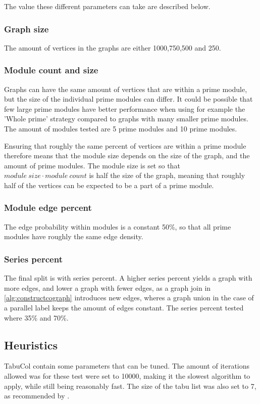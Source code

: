 \documentclass[a4paper]{article}
\begin{document}
The value these different parameters can take are described below.
\subsubsection{Graph size}

The amount of vertices in the graphs are either 1000,750,500 and 250.

\subsubsection{Module count and size}

Graphs can have the same amount of vertices that are within a prime module,
but the size of the individual prime modules can differ. It could be possible that
few large prime modules have better performance when using for example the
'Whole prime' strategy compared to graphs with many smaller prime modules.
The amount of modules tested are 5 prime modules and 10 prime modules.

Ensuring that roughly the same percent of vertices are within a prime module
therefore means that the module size depends on the size of the graph, and the
amount of prime modules. The module size is set so that $module\ size \cdot
module\ count$ is half the size of the graph, meaning that roughly half of the
vertices can be expected to be a part of a prime module.

\subsubsection{Module edge percent}
The edge probability within modules is a  constant 50\%, so that all
prime modules have roughly the same edge density. 

\subsubsection{Series percent}
The final split is with series percent. A higher series percent yields a graph
with more edges, and lower a graph with fewer  edges, as a graph join in
\autoref{alg:constructcograph} introduces new edges, wheres a graph union in the
case of a parallel label keeps the amount of edges constant. The series percent
tested where 35\% and 70\%.

\subsection{Heuristics}
TabuCol contain some parameters that can be tuned. The amount of
iterations allowed was for these test were set to 10000, making it the slowest
algorithm to apply, while still being reasonably fast. The size of the tabu list 
was also set to 7, as recommended by \cite{1990}.
\end{document}
